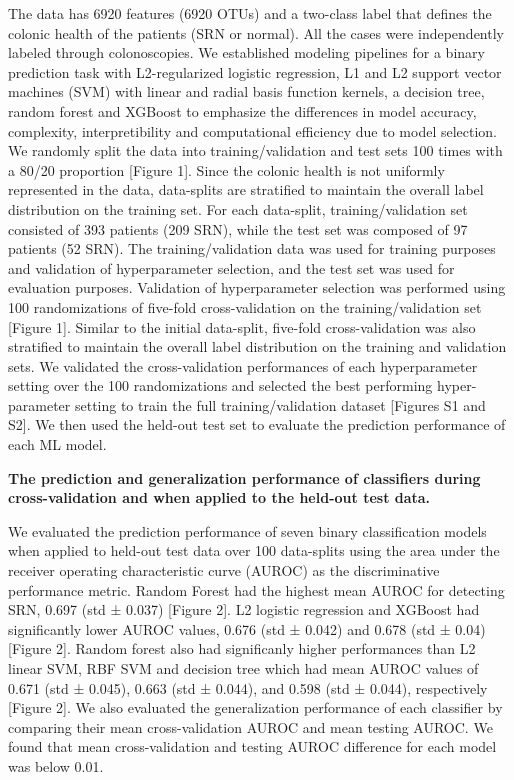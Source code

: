 \documentclass[11pt,]{article}
\begin{document}
The data has 6920 features (6920 OTUs) and a two-class label that
defines the colonic health of the patients (SRN or normal). All the
cases were independently labeled through colonoscopies. We established
modeling pipelines for a binary prediction task with L2-regularized
logistic regression, L1 and L2 support vector machines (SVM) with linear
and radial basis function kernels, a decision tree, random forest and
XGBoost to emphasize the differences in model accuracy, complexity,
interpretibility and computational efficiency due to model selection. We
randomly split the data into training/validation and test sets 100 times
with a 80/20 proportion {[}Figure 1{]}. Since the colonic health is not
uniformly represented in the data, data-splits are stratified to
maintain the overall label distribution on the training set. For each
data-split, training/validation set consisted of 393 patients (209 SRN),
while the test set was composed of 97 patients (52 SRN). The
training/validation data was used for training purposes and validation
of hyperparameter selection, and the test set was used for evaluation
purposes. Validation of hyperparameter selection was performed using 100
randomizations of five-fold cross-validation on the training/validation
set {[}Figure 1{]}. Similar to the initial data-split, five-fold
cross-validation was also stratified to maintain the overall label
distribution on the training and validation sets. We validated the
cross-validation performances of each hyperparameter setting over the
100 randomizations and selected the best performing hyper-parameter
setting to train the full training/validation dataset {[}Figures S1 and
S2{]}. We then used the held-out test set to evaluate the prediction
performance of each ML model.

\textbf{The prediction and generalization performance of classifiers
during cross-validation and when applied to the held-out test data.}

We evaluated the prediction performance of seven binary classification
models when applied to held-out test data over 100 data-splits using the
area under the receiver operating characteristic curve (AUROC) as the
discriminative performance metric. Random Forest had the highest mean
AUROC for detecting SRN, 0.697 (std ± 0.037) {[}Figure 2{]}. L2 logistic
regression and XGBoost had significantly lower AUROC values, 0.676 (std
± 0.042) and 0.678 (std ± 0.04) {[}Figure 2{]}. Random forest also had
significanly higher performances than L2 linear SVM, RBF SVM and
decision tree which had mean AUROC values of 0.671 (std ± 0.045), 0.663
(std ± 0.044), and 0.598 (std ± 0.044), respectively {[}Figure 2{]}. We
also evaluated the generalization performance of each classifier by
comparing their mean cross-validation AUROC and mean testing AUROC. We
found that mean cross-validation and testing AUROC difference for each
model was below 0.01.
\end{document}
